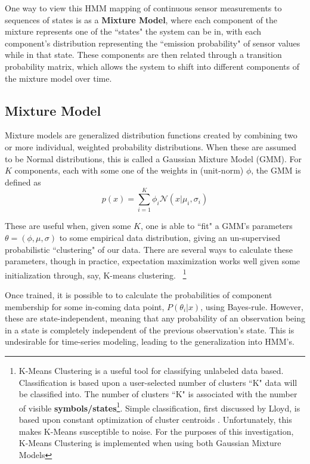 \documentclass[twocolumn,10pt]{article}
\begin{document}
One way to view this HMM mapping of continuous sensor measurements to sequences of states is as a \textbf{Mixture Model}, where each component of the mixture represents one of the ``states" the system can be in, with each component's distribution representing the ``emission probability" of sensor values while in that state. These components are then related through a transition probability matrix, which allows the system to shift into different components of the mixture model over time. 

\subsection{Mixture Model}\label{sec:gmm}
Mixture models are generalized distribution functions created by combining two or more individual, weighted probability distributions. When these are assumed to be Normal distributions, this is called a Gaussian Mixture Model (GMM). For $K$ components, each with some one of the weights in (unit-norm) $\phi$, the GMM is defined as 
\begin{equation}\label{gmm}
    p(x) = \sum_{i=1}^{K} \phi_i\mathcal{N}(x|\mu_i, \sigma_i)
\end{equation}

These are useful when, given some $K$, one is able to ``fit" a GMM's parameters $\theta=(\phi, \mu, \sigma)$ to some empirical data distribution, giving an un-supervised probabilistic ``clustering" of our data. There are several ways to calculate these parameters, though in practice, expectation maximization works well given some initialization through, say, K-means clustering.~\citep{GMMfit} 
\footnote{K-Means Clustering is a useful tool for classifying unlabeled data based. Classification is based upon a user-selected number of clusters ``K" data will be classified into. The number of clusters ``K" is associated with the number of visible \textbf{symbols/states}\footnote{from here on ``symbols" will be used}. Simple classification, first discussed by Lloyd, is based upon constant optimization of cluster centroids \cite{pcm} . Unfortunately, this makes K-Means susceptible to noise. For the purposes of this investigation, K-Means Clustering is implemented when using both Gaussian Mixture Models }

Once trained, it is possible to to calculate the probabilities of component membership for some in-coming data point, $P(\theta_i|x)$,  using Bayes-rule. However, these are state-independent, meaning that any probability of an observation being in a state is completely independent of the previous observation's state. This is undesirable for time-series modeling, leading to the generalization into HMM's.
\end{document}
